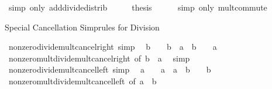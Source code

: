 \begin{isabellebody}
\ {\isacharparenleft}{\kern0pt}simp\ only{\isacharcolon}{\kern0pt}\ add{\isacharunderscore}{\kern0pt}divide{\isacharunderscore}{\kern0pt}distrib{\isacharparenright}{\kern0pt}\isanewline
\ \ \isamarkupfalse%
\ \isamarkupfalse%
\ {\isacharquery}{\kern0pt}thesis\isanewline
\ \ \ \ \isamarkupfalse%
\ {\isacharparenleft}{\kern0pt}simp\ only{\isacharcolon}{\kern0pt}\ mult{\isachardot}{\kern0pt}commute{\isacharparenright}{\kern0pt}\isanewline
{}\isamarkupfalse%
%
\endisatagproof
{\isafoldproof}%
%
\isadelimproof
%
\endisadelimproof
%
\begin{isamarkuptext}%
Special Cancellation Simprules for Division%
\end{isamarkuptext}\isamarkuptrue%
\isamarkupfalse%
\ nonzero{\isacharunderscore}{\kern0pt}divide{\isacharunderscore}{\kern0pt}mult{\isacharunderscore}{\kern0pt}cancel{\isacharunderscore}{\kern0pt}right\ {\isacharbrackleft}{\kern0pt}simp{\isacharbrackright}{\kern0pt}{\isacharcolon}{\kern0pt}\isanewline
\ \ {\isachardoublequoteopen}b\ {\isasymnoteq}\ {}\ {\isasymLongrightarrow}\ b\ {\isacharslash}{\kern0pt}\ {\isacharparenleft}{\kern0pt}a\ {\isacharasterisk}{\kern0pt}\ b{\isacharparenright}{\kern0pt}\ {\isacharequal}{\kern0pt}\ {}\ {\isacharslash}{\kern0pt}\ a{\isachardoublequoteclose}\isanewline
%
\isadelimproof
\ \ %
\endisadelimproof
%
\isatagproof
{}\isamarkupfalse%
\ nonzero{\isacharunderscore}{\kern0pt}mult{\isacharunderscore}{\kern0pt}divide{\isacharunderscore}{\kern0pt}mult{\isacharunderscore}{\kern0pt}cancel{\isacharunderscore}{\kern0pt}right\ {\isacharbrackleft}{\kern0pt}of\ b\ {}\ a{\isacharbrackright}{\kern0pt}\ \isamarkupfalse%
\ simp%
\endisatagproof
{\isafoldproof}%
%
\isadelimproof
\isanewline
%
\endisadelimproof
\isanewline
{}\isamarkupfalse%
\ nonzero{\isacharunderscore}{\kern0pt}divide{\isacharunderscore}{\kern0pt}mult{\isacharunderscore}{\kern0pt}cancel{\isacharunderscore}{\kern0pt}left\ {\isacharbrackleft}{\kern0pt}simp{\isacharbrackright}{\kern0pt}{\isacharcolon}{\kern0pt}\isanewline
\ \ {\isachardoublequoteopen}a\ {\isasymnoteq}\ {}\ {\isasymLongrightarrow}\ a\ {\isacharslash}{\kern0pt}\ {\isacharparenleft}{\kern0pt}a\ {\isacharasterisk}{\kern0pt}\ b{\isacharparenright}{\kern0pt}\ {\isacharequal}{\kern0pt}\ {}\ {\isacharslash}{\kern0pt}\ b{\isachardoublequoteclose}\isanewline
%
\isadelimproof
\ \ %
\endisadelimproof
%
\isatagproof
{}\isamarkupfalse%
\ nonzero{\isacharunderscore}{\kern0pt}mult{\isacharunderscore}{\kern0pt}divide{\isacharunderscore}{\kern0pt}mult{\isacharunderscore}{\kern0pt}cancel{\isacharunderscore}{\kern0pt}left\ {\isacharbrackleft}{\kern0pt}of\ a\ {}\ b{\isacharbrackright}{\kern0pt}\ \isamarkupfalse%

\end{isabellebody}
